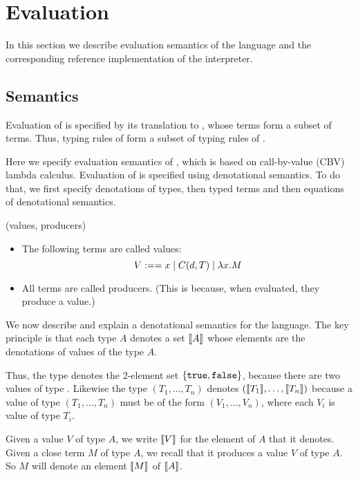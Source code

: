 \section{Evaluation}
\label{sec:evaluation}

In this section we describe evaluation semantics of the \langname language
and the corresponding reference implementation of the interpreter.

\subsection{Semantics}
\label{sec:evaluation:semantics}

Evaluation of \langname is specified by its translation to \corelang, whose
terms form a subset of \langname terms. Thus, typing rules of \corelang form
a subset of typing rules of \langname.

Here we specify evaluation semantics of \corelang, which is based on
call-by-value (CBV) lambda calculus. Evaluation of \corelang is specified
using denotational semantics. To do that, we first specify denotations of
types, then typed terms and then equations of denotational semantics.

\begin{definition}
  (values, producers)
  \begin{itemize}
    \item The following \corelang terms are called values:
    $$ V :== x \mid C(d, T) \mid \lambda x.M$$
    \item All \corelang terms are called producers. (This is because, when evaluated, they produce a value.)
  \end{itemize}
\end{definition}

We now describe and explain a denotational semantics for the \corelang
language. The key principle is that each type $A$ denotes a set $\llbracket A\rrbracket$
whose elements are the denotations of values of the type $A$.

Thus, the type  denotes the 2-element set
$\{\lst{true},\lst{false}\}$, because there are two values of type
. Likewise the type $(T_1,\dots,T_n)$ denotes
$(\llbracket T_1\rrbracket,\dots,\llbracket T_n\rrbracket)$ because a value of type $(T_1,\dots,T_n)$
must be of the form $(V_1,\dots,V_n)$, where each $V_i$ is value of type
$T_i$.

Given a value $V$ of type $A$, we write $\llbracket V\rrbracket$ for the element of $A$
that it denotes. Given a close term $M$ of type $A$, we recall that it
produces a value $V$ of type $A$. So $M$ will denote an element $\llbracket M\rrbracket$
of $\llbracket A\rrbracket$.

